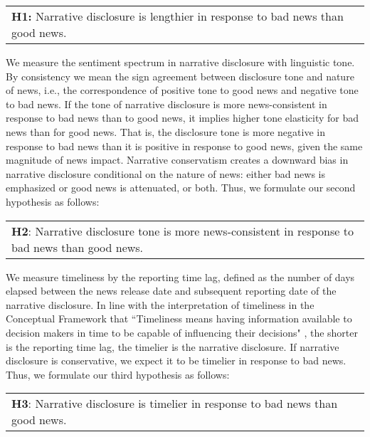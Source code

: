 \documentclass[a4paper]{article}
\begin{document}
\begin{spacing}{2}
\begin{center}
	\begin{tabular}{l}
		\textbf{H1:} Narrative disclosure is lengthier in response to bad news than good news.
	\end{tabular}
\end{center}

We measure the sentiment spectrum in narrative disclosure with linguistic tone. By consistency we mean the sign agreement between disclosure tone and nature of news, i.e., the correspondence of positive tone to good news and negative tone to bad news. If the tone of narrative disclosure is more news-consistent in response to bad news than to good news, it implies higher tone elasticity for bad news than for good news. That is, the disclosure tone is more negative in response to bad news than it is positive in response to good news, given the same magnitude of news impact. Narrative conservatism creates a downward bias in narrative disclosure conditional on the nature of news: either bad news is emphasized or good news is attenuated, or both. Thus, we formulate our second hypothesis as follows:

\begin{center}
	\begin{tabular}{l}
		\textbf{H2}: Narrative disclosure tone is more news-consistent in response to bad news than good news.
	\end{tabular}
\end{center}

We measure timeliness by the reporting time lag, defined as the number of days elapsed between the news release date and subsequent reporting date of the narrative disclosure. In line with the interpretation of timeliness in the Conceptual Framework that ``Timeliness means having information available to decision makers in time to be capable of influencing their decisions" \citep*[QC29]{fasbConceptualFrameworkFinancial2018}, the shorter is the reporting time lag, the timelier is the narrative disclosure. If narrative disclosure is conservative, we expect it to be timelier in response to bad news. Thus, we formulate our third hypothesis as follows:

\begin{center}
	\begin{tabular}{l}
		\textbf{H3}: Narrative disclosure is timelier in response to bad news than good news.
	\end{tabular}
\end{center}


\end{spacing}
\end{document}
